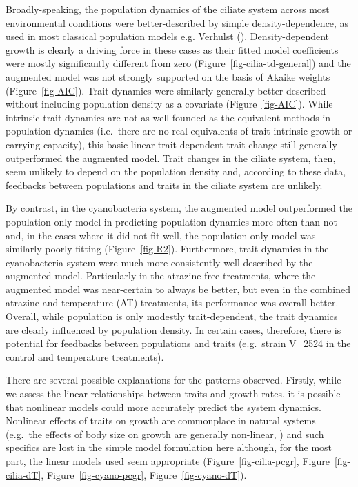 \documentclass[
  letterpaper,
  DIV=11,
  numbers=noendperiod]{scrartcl}
\begin{document}
Broadly-speaking, the population dynamics of the ciliate system across
most environmental conditions were better-described by simple
density-dependence, as used in most classical population models e.g.
Verhulst (). Density-dependent growth
is clearly a driving force in these cases as their fitted model
coefficients were mostly significantly different from zero
(Figure~\ref{fig-cilia-td-general}) and the augmented model was not
strongly supported on the basis of Akaike weights
(Figure~\ref{fig-AIC}). Trait dynamics were similarly generally
better-described without including population density as a covariate
(Figure~\ref{fig-AIC}). While intrinsic trait dynamics are not as
well-founded as the equivalent methods in population dynamics
(i.e.~there are no real equivalents of trait intrinsic growth or
carrying capacity), this basic linear trait-dependent trait change still
generally outperformed the augmented model. Trait changes in the ciliate
system, then, seem unlikely to depend on the population density and,
according to these data, feedbacks between populations and traits in the
ciliate system are unlikely.

By contrast, in the cyanobacteria system, the augmented model
outperformed the population-only model in predicting population dynamics
more often than not and, in the cases where it did not fit well, the
population-only model was similarly poorly-fitting
(Figure~\ref{fig-R2}). Furthermore, trait dynamics in the cyanobacteria
system were much more consistently well-described by the augmented
model. Particularly in the atrazine-free treatments, where the augmented
model was near-certain to always be better, but even in the combined
atrazine and temperature (AT) treatments, its performance was overall
better. Overall, while population is only modestly trait-dependent, the
trait dynamics are clearly influenced by population density. In certain
cases, therefore, there is potential for feedbacks between populations
and traits (e.g.~strain V\_2524 in the control and temperature
treatments).

There are several possible explanations for the patterns observed.
Firstly, while we assess the linear relationships between traits and
growth rates, it is possible that nonlinear models could more accurately
predict the system dynamics. Nonlinear effects of traits on growth are
commonplace in natural systems (e.g.~the effects of body size on growth
are generally non-linear,
) and such specifics are lost in the simple model formulation here
although, for the most part, the linear models used seem appropriate
(Figure~\ref{fig-cilia-pcgr}, Figure~\ref{fig-cilia-dT},
Figure~\ref{fig-cyano-pcgr}, Figure~\ref{fig-cyano-dT}).
\end{document}
